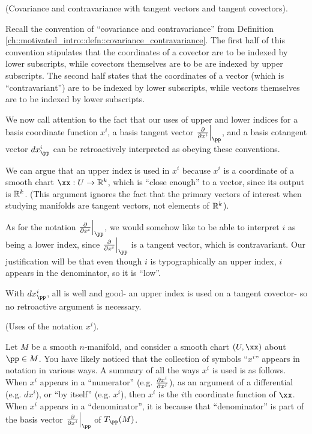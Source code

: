 \begin{remark}
    (Covariance and contravariance with tangent vectors and tangent covectors).
    
    Recall the convention of ``covariance and contravariance'' from Definition \ref{ch::motivated_intro::defn::covariance_contravariance}. The first half of this convention stipulates that the coordinates of a covector are to be indexed by lower subscripts, while covectors themselves are to be are indexed by upper subscripts. The second half states that the coordinates of a vector (which is ``contravariant'') are to be indexed by lower subscripts, while vectors themselves are to be indexed by lower subscripts.
    
    We now call attention to the fact that our uses of upper and lower indices for a basis coordinate function $x^i$, a basis tangent vector $\frac{\pd}{\pd x^i}\Big|_\pp$, and a basis cotangent vector $dx^i_\pp$ can be retroactively interpreted as obeying these conventions. 
    
    We can argue that an upper index is used in $x^i$ because $x^i$ is a coordinate of a smooth chart $\xx:U \rightarrow \R^k$, which is ``close enough'' to a vector, since its output is $\mathbb{R}^k$. (This argument ignores the fact that the primary vectors of interest when studying manifolds are tangent vectors, not elements of $\mathbb{R}^k$).
    
    As for the notation $\frac{\pd}{\pd x^i}\Big|_\pp$, we would somehow like to be able to interpret $i$ as being a lower index, since $\frac{\pd}{\pd x^i}\Big|_\pp$ is a tangent vector, which is contravariant. Our justification will be that even though $i$ is typographically an upper index, $i$ appears in the denominator, so it is ``low''.
    
    With $dx^i_\pp$, all is well and good- an upper index is used on a tangent covector- so no retroactive argument is necessary. 
\end{remark}

\begin{remark}
    (Uses of the notation $x^i$).
    
    Let $M$ be a smooth $n$-manifold, and consider a smooth chart $(U, \xx)$ about $\pp \in M$. You have likely noticed that the collection of symbols ``$x^i$'' appears in notation in various ways. A summary of all the ways $x^i$ is used is as follows. When $x^i$ appears in a ``numerator'' (e.g. $\frac{\partial x^i}{\partial x^j}$), as an argument of a differential (e.g. $dx^i$), or ``by itself'' (e.g. $x^i$), then $x^i$ is the $i$th coordinate function of $\xx$. When $x^i$ appears in a ``denominator'', it is because that ``denominator'' is part of the basis vector $\frac{\pd}{\pd x^i}\Big|_\pp$ of $T_\pp(M)$.
\end{remark}

